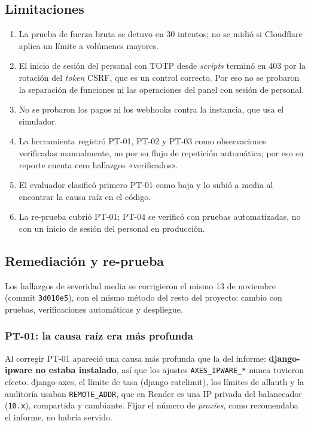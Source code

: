 \documentclass[stu,12pt,floatsintext]{apa7}
\newcommand{\ruta}[1]{{\urlstyle{tt}\nolinkurl{#1}}}
\begin{document}
\subsection{Limitaciones}

\begin{enumerate}[leftmargin=0.5in]
  \item La prueba de fuerza bruta se detuvo en 30 intentos; no se midió si Cloudflare aplica un límite
        a volúmenes mayores.
  \item El inicio de sesión del personal con TOTP desde \textit{scripts} terminó en 403 por la rotación
        del \textit{token} CSRF, que es un control correcto. Por eso no se probaron la separación de
        funciones ni las operaciones del panel con sesión de personal.
  \item No se probaron los pagos ni los webhooks contra la instancia, que usa el simulador.
  \item La herramienta registró PT-01, PT-02 y PT-03 como observaciones verificadas manualmente, no por
        su flujo de repetición automática; por eso su reporte cuenta cero hallazgos «verificados».
  \item El evaluador clasificó primero PT-01 como baja y lo subió a media al encontrar la causa raíz en
        el código.
  \item La re-prueba cubrió PT-01; PT-04 se verificó con pruebas automatizadas, no con un inicio de
        sesión del personal en producción.
\end{enumerate}

\subsection{Remediación y re-prueba}

Los hallazgos de severidad media se corrigieron el mismo 13 de noviembre (commit \ruta{3d010e5}), con
el mismo método del resto del proyecto: cambio con pruebas, verificaciones automáticas y despliegue.

\subsubsection{PT-01: la causa raíz era más profunda}

Al corregir PT-01 apareció una causa más profunda que la del informe: \textbf{django-ipware no estaba
instalado}, así que los ajustes \texttt{AXES\_IPWARE\_*} nunca tuvieron efecto. django-axes, el límite
de tasa (django-ratelimit), los límites de allauth y la auditoría usaban \texttt{REMOTE\_ADDR}, que en
Render es una IP privada del balanceador (\texttt{10.x}), compartida y cambiante. Fijar el número de
\textit{proxies}, como recomendaba el informe, no habría servido.
\end{document}
